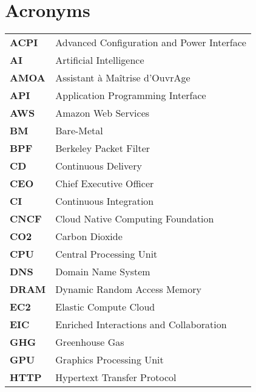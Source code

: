 \chapter{Acronyms}

\begin{tabular}{l l}

    \textbf{ACPI} & Advanced Configuration and Power Interface \\
    \textbf{AI} & Artificial Intelligence \\
    \textbf{AMOA} & Assistant à Maîtrise d'OuvrAge \\
    \textbf{API} & Application Programming Interface \\
    \textbf{AWS} & Amazon Web Services \\
    \textbf{BM} & Bare-Metal \\
    \textbf{BPF} & Berkeley Packet Filter \\
    \textbf{CD} & Continuous Delivery \\
    \textbf{CEO} & Chief Executive Officer \\
    \textbf{CI} & Continuous Integration \\
    \textbf{CNCF} & Cloud Native Computing Foundation \\
    \textbf{CO2} & Carbon Dioxide \\
    \textbf{CPU} & Central Processing Unit \\
    \textbf{DNS} & Domain Name System \\
    \textbf{DRAM} & Dynamic Random Access Memory \\
    \textbf{EC2} & Elastic Compute Cloud \\
    \textbf{EIC} & Enriched Interactions and Collaboration \\
    \textbf{GHG} & Greenhouse Gas \\
    \textbf{GPU} & Graphics Processing Unit \\
    \textbf{HTTP} & Hypertext Transfer Protocol \\

\end{tabular}

\pagebreak

